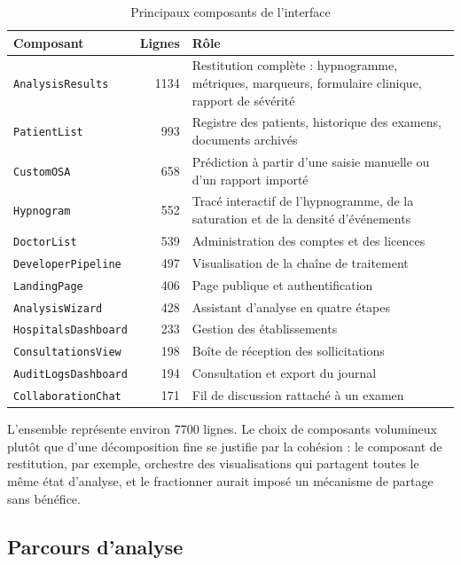 \begin{table}[H]
\centering
\caption{Principaux composants de l'interface}
\label{tab:composants}
\small
\begin{tabular}{@{}lrL{8.0cm}@{}}
\toprule
\textbf{Composant} & \textbf{Lignes} & \textbf{Rôle} \\
\midrule
\texttt{AnalysisResults} & 1134 & Restitution complète : hypnogramme, métriques,
                                  marqueurs, formulaire clinique, rapport de sévérité \\
\texttt{PatientList}     &  993 & Registre des patients, historique des examens,
                                  documents archivés \\
\texttt{CustomOSA}       &  658 & Prédiction à partir d'une saisie manuelle ou d'un
                                  rapport importé \\
\texttt{Hypnogram}       &  552 & Tracé interactif de l'hypnogramme, de la saturation
                                  et de la densité d'événements \\
\texttt{DoctorList}      &  539 & Administration des comptes et des licences \\
\texttt{DeveloperPipeline} & 497 & Visualisation de la chaîne de traitement \\
\texttt{LandingPage}     &  406 & Page publique et authentification \\
\texttt{AnalysisWizard}  &  428 & Assistant d'analyse en quatre étapes \\
\texttt{HospitalsDashboard} & 233 & Gestion des établissements \\
\texttt{ConsultationsView}  & 198 & Boîte de réception des sollicitations \\
\texttt{AuditLogsDashboard} & 194 & Consultation et export du journal \\
\texttt{CollaborationChat}  & 171 & Fil de discussion rattaché à un examen \\
\bottomrule
\end{tabular}
\end{table}

L'ensemble représente environ \num{7700} lignes. Le choix de composants volumineux
plutôt que d'une décomposition fine se justifie par la cohésion : le composant de
restitution, par exemple, orchestre des visualisations qui partagent toutes le même
état d'analyse, et le fractionner aurait imposé un mécanisme de partage sans bénéfice.

\subsection{Parcours d'analyse}

